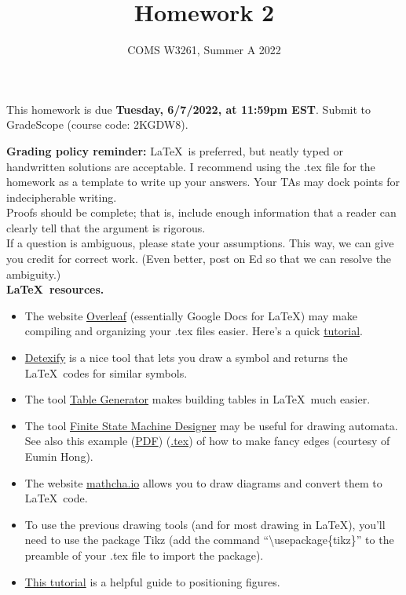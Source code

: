\documentclass{../homework}
\title{Homework 2}
\date{COMS W3261, Summer A 2022}
\begin{document}
\maketitle

This homework is due \textbf{Tuesday, 6/7/2022, at 11:59pm EST}. Submit to GradeScope (course code: 2KGDW8).

\textbf{Grading policy reminder:} \LaTeX~is preferred, but neatly typed or handwritten solutions are acceptable. I recommend using the .tex file for the homework as a template to write up your answers. Your TAs may dock points for indecipherable writing.\\

Proofs should be complete; that is, include enough information that a reader can clearly tell that the argument is rigorous. \\

If a question is ambiguous, please state your assumptions. This way, we can give you credit for correct work. (Even better, post on Ed so that we can resolve the ambiguity.) \\

\textbf{\LaTeX~resources.}
\begin{itemize}
    \item The website \href{https://www.overleaf.com/}{Overleaf} (essentially Google Docs for LaTeX) may make compiling and organizing your .tex files easier. Here's a quick \href{https://www.overleaf.com/learn/latex/Learn_LaTeX_in_30_minutes}{tutorial}.
    \item \href{https://detexify.kirelabs.org/classify.html}{Detexify} is a nice tool that lets you draw a symbol and returns the \LaTeX~codes for similar symbols. 
    \item The tool \href{https://www.tablesgenerator.com/}{Table Generator} makes building tables in \LaTeX~much easier.
    \item The tool \href{http://madebyevan.com/fsm/}{Finite State Machine Designer} may be useful for drawing automata. See also this example (\href{https://static.us.edusercontent.com/files/HZeTXimODzWeLvHIqsvjL2BG}{PDF}) (\href{https://static.us.edusercontent.com/files/RI3W8tQNvHMWFe9MkXV1KztA}{.tex}) of how to make fancy edges (courtesy of Eumin Hong).
    \item The website \href{https://www.mathcha.io/}{mathcha.io} allows you to draw diagrams and convert them to \LaTeX~code.
    \item To use the previous drawing tools (and for most drawing in \LaTeX), you'll need to use the package Tikz (add the command ``\textbackslash usepackage\{tikz\}'' to the preamble of your .tex file to import the package). 
    \item \href{https://www.overleaf.com/learn/latex/Positioning_of_Figures}{This tutorial} is a helpful guide to positioning figures.
\end{itemize}  
\end{document}
